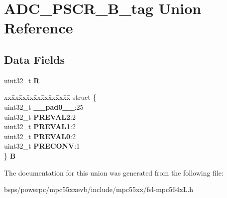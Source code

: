 \hypertarget{unionADC__PSCR__32B__tag}{}\section{A\+D\+C\+\_\+\+P\+S\+C\+R\+\_\+B\+\_\+tag Union Reference}
\label{unionADC__PSCR__32B__tag}
\subsection*{Data Fields}
\begin{DoxyCompactItemize}
\item 
\mbox{\label{unionADC__PSCR__32B__tag_afc21f2f4f617d8ef86a45c6c60769f12}} 
uint32\+\_\+t {\bfseries R}
\item 
\mbox{\label{unionADC__PSCR__32B__tag_ababb4af845ed61e4c54d05f3117e6c5f}} 
\begin{tabbing}
xx\=xx\=xx\=xx\=xx\=xx\=xx\=xx\=xx\=\kill
struct \{\\
\>uint32\_t {\bfseries \_\_pad0\_\_}:25\\
\>uint32\_t {\bfseries PREVAL2}:2\\
\>uint32\_t {\bfseries PREVAL1}:2\\
\>uint32\_t {\bfseries PREVAL0}:2\\
\>uint32\_t {\bfseries PRECONV}:1\\
\} {\bfseries B}\\

\end{tabbing}\end{DoxyCompactItemize}


The documentation for this union was generated from the following file\+:\begin{DoxyCompactItemize}
\item 
bsps/powerpc/mpc55xxevb/include/mpc55xx/fsl-\/mpc564x\+L.\+h\end{DoxyCompactItemize}
